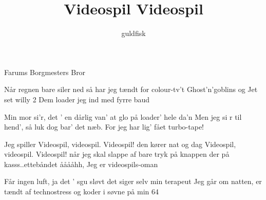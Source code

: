 \documentclass[danish]{article}
\title{Videospil Videospil}
\author{guldfisk}
\begin{document}
\maketitle

\begin{roles}
   Farums Borgmesters Bror
\end{roles}

\begin{song}

Når regnen bare siler ned
så har jeg tændt for colour-tv't
Ghost'n'goblins og Jet set willy 2
Dem loader jeg ind med fyrre baud

Min mor si'r, det ' en dårlig van'
at glo på loader' hele da'n
Men jeg si r til hend', så luk dog bar' det næb.
For jeg har lig' fået turbo-tape!

Jeg spiller
Videospil, videospil. Videospil!
den kører nat og dag
Videospil, videospil. Videospil!
når jeg skal slappe af
bare tryk på knappen
der på kasss..ettebåndet
ååååhh, Jeg er videospils-oman

Får ingen luft, ja det ' sgu sløvt
det siger selv min terapeut
Jeg går om natten, er tændt af technostress
og koder i søvne på min 64

\end{song}
\end{document}
